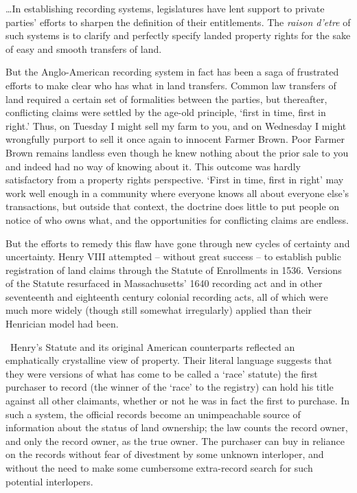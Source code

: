 

\ldots In establishing recording systems, legislatures have lent
support to private parties' efforts to sharpen the definition of their
entitlements. The \textit{raison d'etre} of such systems is to clarify and
perfectly specify landed property rights for the sake of easy and smooth
transfers of land.

But the Anglo-American recording system in fact has been a saga of frustrated
efforts to make clear who has what in land transfers. Common law transfers of
land required a certain set of formalities between the parties, but thereafter,
conflicting claims were settled by the age-old principle, `first in time, first
in right.' Thus, on Tuesday I might sell my farm to you, and on Wednesday I
might wrongfully purport to sell it once again to innocent Farmer Brown. Poor
Farmer Brown remains landless even though he knew nothing about the prior sale
to you and indeed had no way of knowing about it. This outcome was hardly
satisfactory from a property rights perspective. `First in time, first in
right' may work well enough in a community where everyone knows all about
everyone else's transactions, but outside that context, the doctrine does
little to put people on notice of who owns what, and the opportunities for
conflicting claims are endless.

But the efforts to remedy this flaw have gone through new cycles of certainty
and uncertainty. Henry VIII attempted -- without great success -- to establish
public registration of land claims through the Statute of Enrollments in 1536.
Versions of the Statute resurfaced in Massachusetts' 1640 recording act and in
other seventeenth and eighteenth century colonial recording acts, all of which
were much more widely (though still somewhat irregularly) applied than their
Henrician model had been.

~Henry's Statute and its original American counterparts reflected an
emphatically crystalline view of property. Their literal language suggests that
they were versions of what has come to be called a `race' statute) the first
purchaser to record (the winner of the `race' to the registry) can hold his
title against all other claimants, whether or not he was in fact the first to
purchase. In such a system, the official records become an unimpeachable source
of information about the status of land ownership; the law counts the record
owner, and only the record owner, as the true owner. The purchaser can buy in
reliance on the records without fear of divestment by some unknown interloper,
and without the need to make some cumbersome extra-record search for such
potential interlopers.

